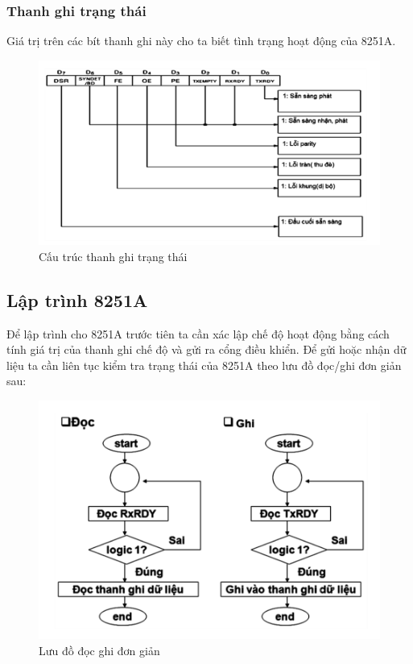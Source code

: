 \documentclass[../report.tex]{subfiles}
\begin{document}
\subsubsection{Thanh ghi trạng thái}
Giá trị trên các bít thanh ghi này cho ta biết tình trạng hoạt động của 8251A.
\begin{figure}[H]
    \centering
    \includegraphics[width=\textwidth]{figures/trangthai.png}
    \caption{Cấu trúc thanh ghi trạng thái}
\end{figure}

\newpage
\subsection{Lập trình 8251A}
Để lập trình cho 8251A trước tiên ta cần xác lập chế độ hoạt động bằng cách tính giá trị
của thanh ghi chế độ và gửi ra cổng điều khiển. Để gửi hoặc nhận dữ liệu ta cần liên tục kiểm
tra trạng thái của 8251A theo lưu đồ đọc/ghi đơn giản sau:
\begin{figure}[H]
    \centering
    \includegraphics[width=\textwidth]{figures/io.png}
    \caption{Lưu đồ đọc ghi đơn giản}
\end{figure}
\end{document}
